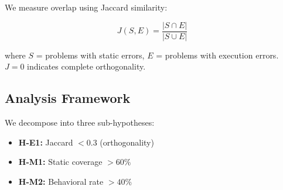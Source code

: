 We measure overlap using Jaccard similarity:

\begin{equation}
J(S, E) = \frac{|S \cap E|}{|S \cup E|}
\end{equation}

where $S$ = problems with static errors, $E$ = problems with execution errors. $J = 0$ indicates complete orthogonality.

\subsection{Analysis Framework}

We decompose into three sub-hypotheses:
\begin{itemize}
    \item \textbf{H-E1:} Jaccard $< 0.3$ (orthogonality)
    \item \textbf{H-M1:} Static coverage $> 60\%$
    \item \textbf{H-M2:} Behavioral rate $> 40\%$
\end{itemize}
